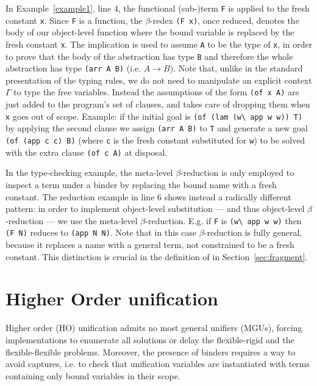 \documentclass{llncs}
\begin{document}
In Example~\ref{example1}, line 4, the functional (sub-)term
\verb+F+ is applied to the fresh constant \verb+x+. Since \verb+F+ is a
function, the $\beta$-redex \verb+(F x)+, once reduced, denotes the body of
our object-level function where the bound variable is replaced by the fresh
constant \verb+x+.
The implication is used to
assume \verb+A+ to be the type of \verb+x+, in order to prove that the body of
the abstraction has type \verb+B+ and therefore the whole abstraction has type
\verb+(arr A B)+ (i.e. $A \to B$). Note that, unlike in
the standard presentation of the typing rules, we do not need to manipulate an
explicit context $\Gamma$ to type the free variables. Instead the assumptions
of the form \verb+(of x A)+ are just added to the program's set of clauses, and \lp{}
takes care of dropping them when \verb+x+ goes out of scope.
Example: if the initial goal is
\verb+(of (lam (w\ app w w)) T)+ by applying the second clause we assign
\verb+(arr A B)+ to \verb+T+ and generate
a new goal \verb+(of (app c c) B)+ (where \verb+c+ is the fresh constant
substituted for \verb+w+) to be solved with the extra clause \verb+(of c A)+
at disposal.

In the type-checking example, the meta-level $\beta$-reduction is only employed
to inspect a term under a binder by replacing the bound name with a fresh
constant. The reduction example in line 6
shows instead a radically different pattern: in order to implement object-level
substitution --- and thus object-level $\beta$-reduction --- we use the
meta-level $\beta$-reduction. E.g. if \verb+F+ is \verb+(w\ app w w)+
then \verb+(F N)+ reduces to \verb+(app N N)+. Note that in this case
$\beta$-reduction is fully general, because it replaces a name with a
general term, not constrained to be a fresh constant.
This distinction is crucial in the definition of \rff{} in
Section~\ref{sec:fragment}.

\section{Higher Order unification}%
\label{sec:ho}
Higher order (HO) unification admits no most general unifiers (MGUs), forcing
implementations to enumerate all solutions or delay the flexible-rigid
and the flexible-flexible problems. Moreover, the presence of binders
requires a way to avoid captures, i.e. to check that unification variables
are instantiated with terms containing only bound variables in their scope.
\end{document}
